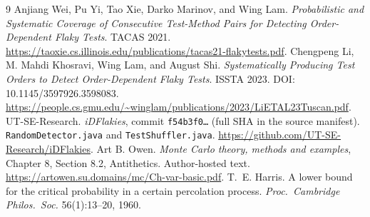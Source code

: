\documentclass[11pt,a4paper]{article}
\theoremstyle{definition}\newtheorem{definition}[theorem]{Definition}
\theoremstyle{remark}\newtheorem{remark}[theorem]{Remark}
\theoremstyle{definition}\newtheorem{xexample}[xtheorem]{Example}\theoremstyle{plain}
\begin{document}
\begin{thebibliography}{9}
 Anjiang Wei, Pu Yi, Tao Xie, Darko Marinov, and Wing Lam.
\emph{Probabilistic and Systematic Coverage of Consecutive Test-Method Pairs for Detecting Order-Dependent Flaky Tests}. TACAS 2021.
\url{https://taoxie.cs.illinois.edu/publications/tacas21-flakytests.pdf}.
 Chengpeng Li, M. Mahdi Khosravi, Wing Lam, and August Shi.
\emph{Systematically Producing Test Orders to Detect Order-Dependent Flaky Tests}. ISSTA 2023. DOI: 10.1145/3597926.3598083.
\url{https://people.cs.gmu.edu/~winglam/publications/2023/LiETAL23Tuscan.pdf}.
 UT-SE-Research. \emph{iDFlakies}, commit
\texttt{f54b3f0\ldots} (full SHA in the source manifest).
\texttt{RandomDetector.java} and \texttt{TestShuffler.java}.
\url{https://github.com/UT-SE-Research/iDFlakies}.
 Art B. Owen. \emph{Monte Carlo theory, methods and examples}, Chapter 8, Section 8.2, Antithetics. Author-hosted text.
\url{https://artowen.su.domains/mc/Ch-var-basic.pdf}.
 T.~E. Harris. A lower bound for the critical probability in a certain percolation process. \emph{Proc.\ Cambridge Philos.\ Soc.} 56(1):13--20, 1960.
\end{thebibliography}
\end{document}
